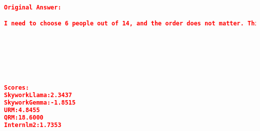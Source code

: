 \begin{lstlisting}[language=json,numbers=none]
Original Answer:

I need to choose 6 people out of 14, and the order does not matter. This is a combination problem, not a permutation problem. The formula for combinations is nCr = n! / (r! * (n-r)!), where n is the total number of choices and r is the number of selections. Plugging in the numbers, I get 14C6 = 14! / (6! * 8!) = 3003. 






  
Scores:
SkyworkLlama:2.3437
SkyworkGemma:-1.8515
URM:4.8455
QRM:18.6000
Internlm2:1.7353
\end{lstlisting}